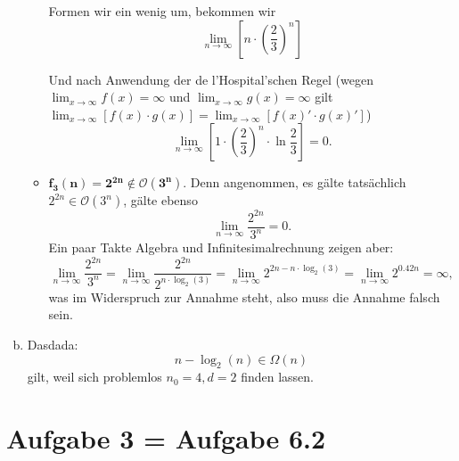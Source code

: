 \documentclass[11pt]{article} %
\theoremstyle{definition}
\begin{document}
\begin{enumerate}[(a)]
\begin{itemize}
Formen wir ein wenig um, bekommen wir
\[
\lim_{n\rightarrow \infty} \left[n \cdot \left(\frac{2}{3}\right)^n\right]
\]

Und nach Anwendung der de l'Hospital'schen Regel (wegen $\lim_{x\rightarrow\infty} f(x) = \infty$ und $\lim_{x\rightarrow\infty} g(x) = \infty$ gilt $\lim_{x\rightarrow\infty} [f(x)\cdot g(x)] = \lim_{x\rightarrow\infty} [f(x)'\cdot g(x)']$)
\[
\lim_{n\rightarrow \infty} \left[1 \cdot \left(\frac{2}{3}\right)^n \cdot \ln\frac{2}{3} \right] = 0.
\]

\item ${\mathbf{f_3(n) = 2^{2n} \notin \mathcal{O}(3^n)}}$. Denn angenommen, es gälte tatsächlich ${{2^{2n} \in \mathcal{O}(3^n)}}$, gälte ebenso
\[
\lim_{n\rightarrow \infty} \frac{2^{2n}}{3^n} = 0.
\]
Ein paar Takte Algebra und Infinitesimalrechnung zeigen aber:
\[
\lim_{n\rightarrow \infty} \frac{2^{2n}}{3^n} = \lim_{n\rightarrow \infty} \frac{2^{2n}}{2^{n\cdot \log_2(3)}} = \lim_{n \rightarrow \infty} 2^{2n - n\cdot \log_2(3)} = \lim_{n\rightarrow \infty} 2^{0.42n} = \infty,
\]
was im Widerspruch zur Annahme steht, also muss die Annahme falsch sein.

\end{itemize}

\item Dasdada:
\[
n - \log_2(n) \in \Omega(n)
\]
gilt, weil sich problemlos $n_0 = 4, d = 2$ finden lassen.

\end{enumerate}

\section*{Aufgabe 3 = Aufgabe 6.2}
\end{document}
